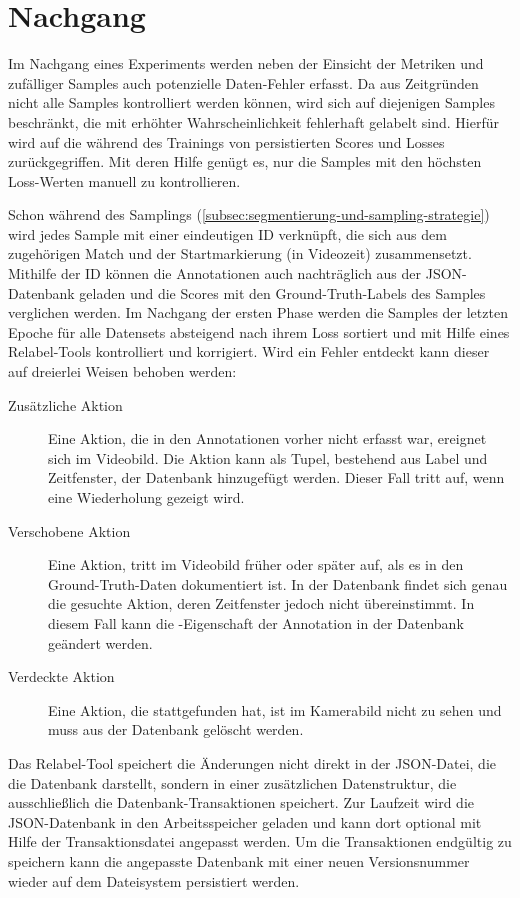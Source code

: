 \section{Nachgang}
\label{sec:nachgang}

Im Nachgang eines Experiments werden neben der Einsicht der Metriken und zufälliger Samples auch potenzielle Daten-Fehler erfasst.
Da aus Zeitgründen nicht alle Samples kontrolliert werden können, wird sich auf diejenigen Samples beschränkt, die mit erhöhter Wahrscheinlichkeit fehlerhaft gelabelt sind.
Hierfür wird auf die während des Trainings von  persistierten Scores und Losses zurückgegriffen.
Mit deren Hilfe genügt es, nur die Samples mit den höchsten Loss-Werten manuell zu kontrollieren.

Schon während des Samplings (\autoref{subsec:segmentierung-und-sampling-strategie}) wird jedes Sample mit einer eindeutigen ID verknüpft, die sich aus dem zugehörigen Match und der Startmarkierung (in Videozeit) zusammensetzt.
Mithilfe der ID können die Annotationen auch nachträglich aus der JSON-Datenbank geladen und die Scores mit den Ground-Truth-Labels des Samples verglichen werden.
Im Nachgang der ersten Phase werden die Samples der letzten Epoche für alle Datensets absteigend nach ihrem Loss sortiert und mit Hilfe eines Relabel-Tools kontrolliert und \ggf korrigiert.
Wird ein Fehler entdeckt kann dieser auf dreierlei Weisen behoben werden:

\begin{description}
    \item[Zusätzliche Aktion] Eine Aktion, die in den Annotationen vorher nicht erfasst war, ereignet sich im Videobild.
    Die Aktion kann als Tupel, bestehend aus Label und Zeitfenster, der Datenbank hinzugefügt werden.
    Dieser Fall tritt \zB auf, wenn eine Wiederholung gezeigt wird.
    \item[Verschobene Aktion] Eine Aktion, tritt im Videobild früher oder später auf, als es in den Ground-Truth-Daten dokumentiert ist.
    In der Datenbank findet sich genau die gesuchte Aktion, deren Zeitfenster jedoch nicht übereinstimmt.
    In diesem Fall kann die -Eigenschaft der Annotation in der Datenbank geändert werden.
    \item[Verdeckte Aktion] Eine Aktion, die stattgefunden hat, ist im Kamerabild nicht zu sehen und muss aus der Datenbank gelöscht werden.
\end{description}

Das Relabel-Tool speichert die Änderungen nicht direkt in der JSON-Datei, die die Datenbank darstellt, sondern in einer zusätzlichen Datenstruktur, die ausschließlich die Datenbank-Transaktionen speichert.
Zur Laufzeit wird die JSON-Datenbank in den Arbeitsspeicher geladen und kann dort optional mit Hilfe der Transaktionsdatei angepasst werden.
Um die Transaktionen endgültig zu speichern kann die angepasste Datenbank mit einer neuen Versionsnummer wieder auf dem Dateisystem persistiert werden.
